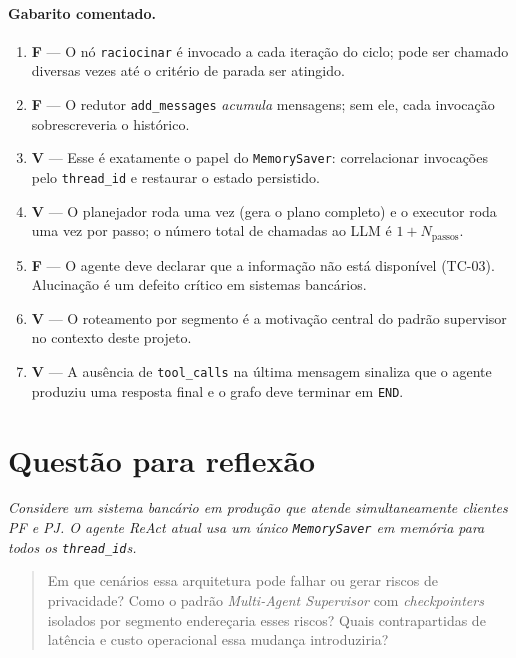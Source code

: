 \paragraph{Gabarito comentado.}

\begin{enumerate}[leftmargin=*]
  \item \textbf{F} --- O n\'o \texttt{raciocinar} \'e invocado a
        cada itera\c{c}\~ao do ciclo; pode ser chamado diversas vezes
        at\'e o crit\'erio de parada ser atingido.
  \item \textbf{F} --- O redutor \texttt{add\_messages}
        \textit{acumula} mensagens; sem ele, cada invoca\c{c}\~ao
        sobrescreveria o hist\'orico.
  \item \textbf{V} --- Esse \'e exatamente o papel do
        \texttt{MemorySaver}: correlacionar invoca\c{c}\~oes pelo
        \texttt{thread\_id} e restaurar o estado persistido.
  \item \textbf{V} --- O planejador roda uma vez (gera o plano
        completo) e o executor roda uma vez por passo; o n\'umero
        total de chamadas ao LLM \'e $1 + N_{\text{passos}}$.
  \item \textbf{F} --- O agente deve declarar que a informa\c{c}\~ao
        n\~ao est\'a dispon\'ivel (TC-03). Alucinação é um defeito
        cr\'itico em sistemas banc\'arios.
  \item \textbf{V} --- O roteamento por segmento \'e a motiva\c{c}\~ao
        central do padr\~ao supervisor no contexto deste projeto.
  \item \textbf{V} --- A aus\^encia de \texttt{tool\_calls} na
        \'ultima mensagem sinaliza que o agente produziu uma resposta
        final e o grafo deve terminar em \texttt{END}.
\end{enumerate}

\section{Quest\~ao para reflex\~ao}
\label{sec:reflexao_cap03}

\textit{Considere um sistema banc\'ario em produ\c{c}\~ao que atende
simultaneamente clientes PF e PJ. O agente ReAct atual usa um
\'unico \texttt{MemorySaver} em mem\'oria para todos os
\texttt{thread\_id}s.}

\begin{quote}
Em que cen\'arios essa arquitetura pode falhar ou gerar riscos de
privacidade? Como o padr\~ao \textit{Multi-Agent Supervisor} com
\textit{checkpointers} isolados por segmento endere\c{c}aria esses
riscos? Quais contrapartidas de lat\^encia e custo operacional essa
mudan\c{c}a introduziria?
\end{quote}

